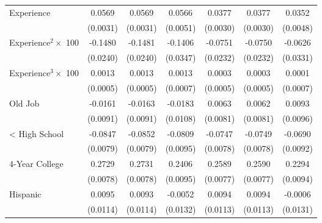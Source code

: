 {\begin{longtable}{l*{6}{c}}
Experience          &      0.0569\sym{***}&      0.0569\sym{***}&      0.0566\sym{***}&      0.0377\sym{***}&      0.0377\sym{***}&      0.0352\sym{***}\\
                    &    (0.0031)         &    (0.0031)         &    (0.0051)         &    (0.0030)         &    (0.0030)         &    (0.0048)         \\
Experience$^2\times$ 100&     -0.1480\sym{***}&     -0.1481\sym{***}&     -0.1406\sym{***}&     -0.0751\sym{***}&     -0.0750\sym{***}&     -0.0626\sym{*}  \\
                    &    (0.0240)         &    (0.0240)         &    (0.0347)         &    (0.0232)         &    (0.0232)         &    (0.0331)         \\
Experience$^3\times$ 100&      0.0013\sym{**} &      0.0013\sym{**} &      0.0013\sym{*}  &      0.0003         &      0.0003         &      0.0001         \\
                    &    (0.0005)         &    (0.0005)         &    (0.0007)         &    (0.0005)         &    (0.0005)         &    (0.0007)         \\
Old Job             &     -0.0161\sym{*}  &     -0.0163\sym{*}  &     -0.0183\sym{*}  &      0.0063         &      0.0062         &      0.0093         \\
                    &    (0.0091)         &    (0.0091)         &    (0.0108)         &    (0.0081)         &    (0.0081)         &    (0.0096)         \\
< High School       &     -0.0847\sym{***}&     -0.0852\sym{***}&     -0.0809\sym{***}&     -0.0747\sym{***}&     -0.0749\sym{***}&     -0.0690\sym{***}\\
                    &    (0.0079)         &    (0.0079)         &    (0.0095)         &    (0.0078)         &    (0.0078)         &    (0.0092)         \\
4-Year College      &      0.2729\sym{***}&      0.2731\sym{***}&      0.2406\sym{***}&      0.2589\sym{***}&      0.2590\sym{***}&      0.2294\sym{***}\\
                    &    (0.0078)         &    (0.0078)         &    (0.0095)         &    (0.0077)         &    (0.0077)         &    (0.0094)         \\
Hispanic            &      0.0095         &      0.0093         &     -0.0052         &      0.0094         &      0.0094         &     -0.0006         \\
                    &    (0.0114)         &    (0.0114)         &    (0.0132)         &    (0.0113)         &    (0.0113)         &    (0.0131)         \\

\end{longtable}}
